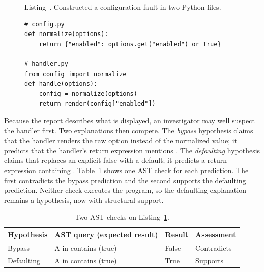 \documentclass[a4paper,fleqn]{cas-sc}
\newcommand{\code}[1]{\texttt{\detokenize{#1}}}
\begin{document}
\begin{figure}[pos=H]
\label{lst:example}
{\centering\sffamily\footnotesize Listing~\thelstlisting. Constructed a configuration fault in two Python files.\par}
\vspace{3pt}
\begin{codebox}
\begin{lstlisting}[style=morph]
# config.py
def normalize(options):
    return {"enabled": options.get("enabled") or True}

# handler.py
from config import normalize
def handle(options):
    config = normalize(options)
    return render(config["enabled"])
\end{lstlisting}
\end{codebox}
\end{figure}

Because the report describes what is displayed, an investigator may well suspect the handler first. Two explanations then compete. The \emph{bypass} hypothesis claims that the handler renders the raw option instead of the normalized value; it predicts that the handler's return expression mentions \code{options}. The \emph{defaulting} hypothesis claims that \code{normalize} replaces an explicit false with a default; it predicts a return expression containing \code{or True}. Table~\ref{tab:example_checks} shows one AST check for each prediction. The first contradicts the bypass prediction and the second supports the defaulting prediction. Neither check executes the program, so the defaulting explanation remains a hypothesis, now with structural support.

\begin{table}[pos=!htbp]
\caption{Two AST checks on Listing~\ref{lst:example}.}\label{tab:example_checks}
\centering\small\setlength{\tabcolsep}{2pt}
\begin{tabular}{@{}>{\raggedright\arraybackslash}p{}>{\raggedright\arraybackslash}p{}>{\raggedright\arraybackslash}p{}>{\raggedright\arraybackslash}p{}@{}}\toprule
Hypothesis & AST query (expected result) & Result & Assessment\\\midrule
Bypass & A \code{return} in \code{handler.py} contains \code{options} (true) & False & Contradicts\\
Defaulting & A \code{return} in \code{config.py} contains \code{or True} (true) & True & Supports\\
\bottomrule\end{tabular}
\end{table}
\end{document}
